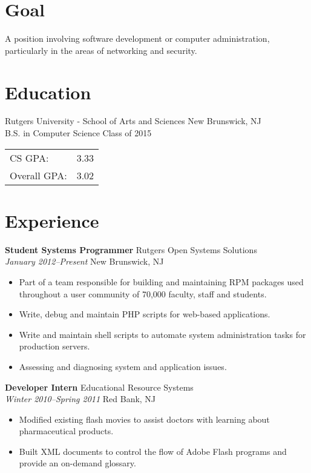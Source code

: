 \documentclass[centered,overlapped]{res}
\begin{document}

\address{153 Riveredge Road \\ Tinton Falls, NJ 07724}
\address{josh@jmatthews.us \\ github.com/jmatth}

\begin{resume}

\section{Goal}
A position involving software development or computer administration, particularly in the areas of networking and security.

\section{Education}

Rutgers University - School of Arts and Sciences \hfill New Brunswick, NJ\\
B.S. in Computer Science \hfill Class of 2015 \\
\begin{tabular}{l l}
	CS GPA: & 3.33 \\
	Overall GPA: & 3.02 \\
\end{tabular}

\section{Experience}

{\bf Student Systems Programmer} \hfill Rutgers Open Systems Solutions\\
\textit{January 2012--Present} \hfill New Brunswick, NJ
\begin{itemize} \itemsep -2pt %
	\item Part of a team responsible for building and maintaining RPM packages used throughout a user community of 70,000 faculty, staff and students.
	\item Write, debug and maintain PHP scripts for web-based applications.
	\item Write and maintain shell scripts to automate system administration tasks for production servers.
	\item Assessing and diagnosing system and application issues.
\end{itemize}

{\bf Developer Intern} \hfill Educational Resource Systems\\
\textit{Winter 2010--Spring 2011} \hfill  Red Bank, NJ
\begin{itemize} \itemsep -2pt %
	\item Modified existing flash movies to assist doctors with learning about pharmaceutical products.
	\item Built XML documents to control the flow of Adobe Flash programs and provide an on-demand glossary.
\end{itemize}


\end{resume}
\end{document}
